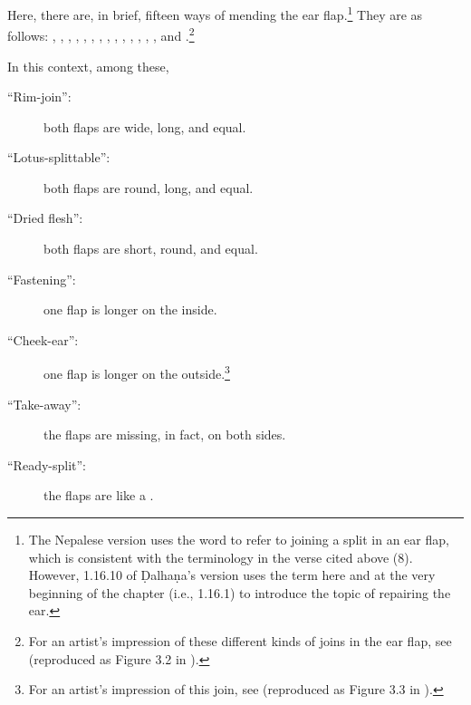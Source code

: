 \begin{translation}
Here, there are, in brief, fifteen ways of mending the ear flap.\footnote{The Nepalese version 
uses the word  to refer to joining a split in an ear flap, which is consistent 
with the terminology in the verse cited above (8). However, 1.16.10 of Ḍalhaṇa's version 
\citep[77]{vulgate} uses the term  here and at the very beginning of the 
chapter (i.e., 1.16.1) to introduce the topic of repairing the ear.}  They are as follows:
    , , 
    , , , 
    , , , 
    , , 
    , ,
    , , and .\footnote{For an artist's impression of these different kinds of joins in the ear flap, see \cite[290]{majn-1975} (reproduced as Figure 3.2 in \cite[154]{wuja-2003}).}
    
    In this context, among these, 

    \begin{description}
        
\item[\mdseries``Rim-join'':]
        both flaps are wide, long, and equal.
        
\item[\mdseries``Lotus-splittable'':]
        both flaps are round, long, and equal.
        
\item[\mdseries``Dried flesh'':]
        both flaps are short, round, and equal.
        
\item[\mdseries``Fastening'':]
        one flap is longer on the inside.
        
\item[\mdseries``Cheek-ear'':]
        one flap is longer on the outside.\footnote{For an artist's impression of this join, see \cite[291]{majn-1975} (reproduced as Figure 3.3 in \cites[155]{wuja-2003}).}
        
\item[\mdseries``Take-away'':]
        the flaps are missing, in fact, on both sides.
        
\item[\mdseries``Ready-split'':]
        the flaps are like a .
        

\end{description}
\end{translation}
